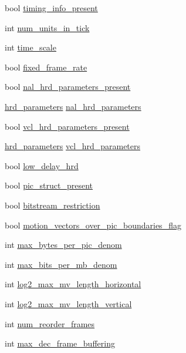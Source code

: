 \begin{DoxyCompactItemize}
\item 
bool \hyperlink{structvui__parameters_adaf48388d9bf427c2f99f6e2768c18c1}{timing\_\-info\_\-present}
\item 
int \hyperlink{structvui__parameters_a6f5741f565bc03fdcb7cbcb896f0e2a1}{num\_\-units\_\-in\_\-tick}
\item 
int \hyperlink{structvui__parameters_af0ed1dbde20025d72bd3f05b1724f045}{time\_\-scale}
\item 
bool \hyperlink{structvui__parameters_af9f34099366738aaba7b6881e057b04d}{fixed\_\-frame\_\-rate}
\item 
bool \hyperlink{structvui__parameters_aa13bb67fd7e3d675b398a06adba94e03}{nal\_\-hrd\_\-parameters\_\-present}
\item 
\hyperlink{structhrd__parameters}{hrd\_\-parameters} \hyperlink{structvui__parameters_a5cc211008bc8bea3b714c97742fc3c74}{nal\_\-hrd\_\-parameters}
\item 
bool \hyperlink{structvui__parameters_a4f9c102f40cf3b536c5e3b70ab0e3681}{vcl\_\-hrd\_\-parameters\_\-present}
\item 
\hyperlink{structhrd__parameters}{hrd\_\-parameters} \hyperlink{structvui__parameters_a12fae463652694b20fe5347dd511a7e3}{vcl\_\-hrd\_\-parameters}
\item 
bool \hyperlink{structvui__parameters_ad6fa91ff0bb86ed6f4dfd4e229255836}{low\_\-delay\_\-hrd}
\item 
bool \hyperlink{structvui__parameters_a9b944ee9d58d5d229061d23093522781}{pic\_\-struct\_\-present}
\item 
bool \hyperlink{structvui__parameters_a9133c7d27732fe749c2696754126a9df}{bitstream\_\-restriction}
\item 
bool \hyperlink{structvui__parameters_ac1672212bb8691495858eea8f586bb6f}{motion\_\-vectors\_\-over\_\-pic\_\-boundaries\_\-flag}
\item 
int \hyperlink{structvui__parameters_a74669d35d6a07d9952150d44d2eec188}{max\_\-bytes\_\-per\_\-pic\_\-denom}
\item 
int \hyperlink{structvui__parameters_a4666db964c96e718569fc4811fa7d55d}{max\_\-bits\_\-per\_\-mb\_\-denom}
\item 
int \hyperlink{structvui__parameters_a87406a68d40994e89ad0307ccefe5313}{log2\_\-max\_\-mv\_\-length\_\-horizontal}
\item 
int \hyperlink{structvui__parameters_aba43feda90cdacd612666d03d162792c}{log2\_\-max\_\-mv\_\-length\_\-vertical}
\item 
int \hyperlink{structvui__parameters_a0ec80014dc268ed6a2cfa9df04193f16}{num\_\-reorder\_\-frames}
\item 
int \hyperlink{structvui__parameters_ab1c5e9e21951a7511ec7b9217d8d9076}{max\_\-dec\_\-frame\_\-buffering}
\end{DoxyCompactItemize}


